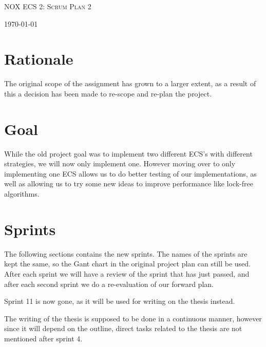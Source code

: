 \documentclass[hidelinks]{article}
\begin{document}
\begin{titlepage}
    \centering
    {\scshape\LARGE NOX ECS 2: Scrum Plan 2 \par}
    \vfill
    {\large \today\par}
\end{titlepage}

\tableofcontents
\pagebreak

\section{Rationale}
The original scope of the assignment has grown to a larger extent, as a result of this a decision has been made to re-scope and re-plan the project.


\section{Goal}
While the old project goal was to implement two different ECS's with different strategies, we will now only implement one.
However moving over to only implementing one ECS allows us to do better testing
of our implementations, as well as allowing us to try some new ideas to improve performance like lock-free algorithms.

\section{Sprints}
The following sections contains the new sprints. The names of the sprints are kept the same, so the Gant chart in the original project plan can still be used.
After each sprint we will have a review of the sprint that has just passed, and after each second sprint we do a re-evaluation of our forward plan.

Sprint 11 is now gone, as it will be used for writing on the thesis instead.

The writing of the thesis is supposed to be done in a continuous manner, however since it will depend on the outline, 
direct tasks related to the thesis are not mentioned after sprint 4.
\end{document}
